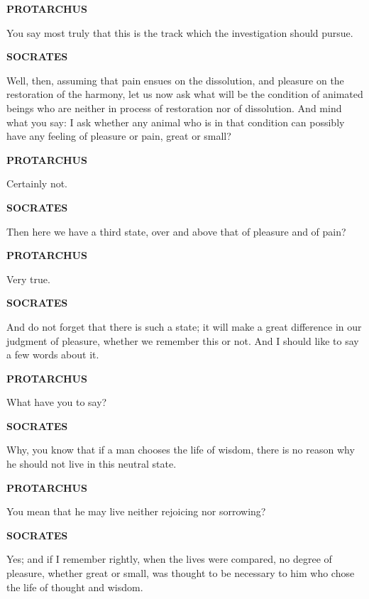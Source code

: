 \documentclass[11pt,letter]{article}
\begin{document}
\par \textbf{PROTARCHUS}
\par   You say most truly that this is the track which the investigation should pursue.

\par \textbf{SOCRATES}
\par   Well, then, assuming that pain ensues on the dissolution, and pleasure on the restoration of the harmony, let us now ask what will be the condition of animated beings who are neither in process of restoration nor of dissolution. And mind what you say:  I ask whether any animal who is in that condition can possibly have any feeling of pleasure or pain, great or small?

\par \textbf{PROTARCHUS}
\par   Certainly not.

\par \textbf{SOCRATES}
\par   Then here we have a third state, over and above that of pleasure and of pain?

\par \textbf{PROTARCHUS}
\par   Very true.

\par \textbf{SOCRATES}
\par   And do not forget that there is such a state; it will make a great difference in our judgment of pleasure, whether we remember this or not. And I should like to say a few words about it.

\par \textbf{PROTARCHUS}
\par   What have you to say?

\par \textbf{SOCRATES}
\par   Why, you know that if a man chooses the life of wisdom, there is no reason why he should not live in this neutral state.

\par \textbf{PROTARCHUS}
\par   You mean that he may live neither rejoicing nor sorrowing?

\par \textbf{SOCRATES}
\par   Yes; and if I remember rightly, when the lives were compared, no degree of pleasure, whether great or small, was thought to be necessary to him who chose the life of thought and wisdom.
\end{document}
